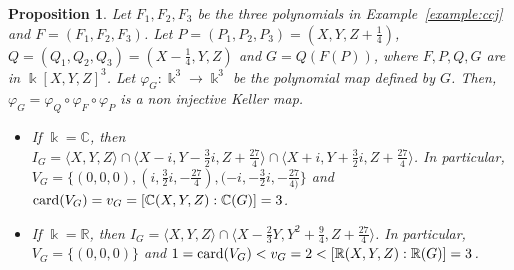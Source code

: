 \documentclass[11pt,reqno]{amsart}
\newtheorem{proposition}[theorem]{Proposition}
\theoremstyle{definition}
\newcommand{\mbk}{\mbox{$\Bbbk$}}
\newcommand{\mbc}{\mbox{$\mathbb{C}$}}
\newcommand{\mbr}{\mbox{$\mathbb{R}$}}
\newcommand{\card}{\mbox{${\rm card}$}}
\begin{document}
\begin{proposition}\label{prop:2max}
Let $F_1,F_2,F_3$ be the three polynomials in {\rm Example~\ref{example:ccj}} and
$F=(F_1,F_2,F_3)$. Let $P=(P_1,P_2,P_3)=(X,Y,Z+\tfrac{1}{4})$, 
$Q=(Q_1,Q_2,Q_3)=(X-\tfrac{1}{4},Y,Z)$ and $G=Q(F(P))$, where
$F,P,Q,G$ are in $\mbk[X,Y,Z]^3$.
Let $\varphi_G:\mbk^3\to \mbk^3$ be the polynomial map defined by $G$. 
Then, $\varphi_G=\varphi_Q\circ\varphi_F\circ\varphi_P$ is a non injective Keller map. 
\begin{itemize}
\item[$(a)$] If $\mbk=\mbc$, then $I_G=\langle X,Y,Z\rangle\cap
\langle X-i,Y-\tfrac{3}{2}i,Z+\tfrac{27}{4}\rangle
\cap \langle X+i,Y+\tfrac{3}{2}i,Z+\tfrac{27}{4}\rangle$. In particular, 
$V_G=\{(0,0,0),(i,\frac{3}{2}i,-\tfrac{27}{4}),(-i,-\tfrac{3}{2}i,-\tfrac{27}{4)}\}$ and
$\card(V_G)=v_G=[\mbc(X,Y,Z):\mbc(G)]=3$.
\item[$(b)$] If $\mbk=\mbr$, then $I_G=\langle X,Y,Z\rangle\cap
\langle X-\tfrac{2}{3}Y,Y^2+\tfrac{9}{4},Z+\tfrac{27}{4}\rangle$. In particular, 
$V_G=\{(0,0,0)\}$ and $1=\card(V_G)<v_G=2<[\mbr(X,Y,Z):\mbr(G)]=3$.
\end{itemize}
\end{proposition}
\end{document}
